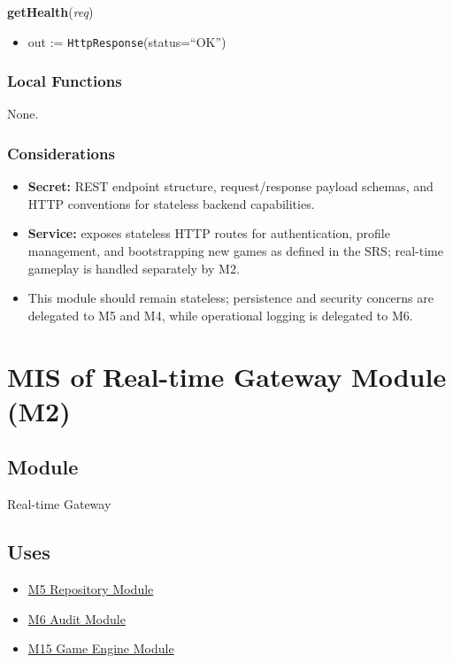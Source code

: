 \documentclass[12pt, titlepage]{article}
\begin{document}
\noindent\textbf{getHealth}(\textit{req})
\begin{itemize}
    \item out := \texttt{HttpResponse}(status=``OK'')
\end{itemize}

\subsubsection{Local Functions}
None.

\subsubsection{Considerations}
\begin{itemize}
    \item \textbf{Secret:} REST endpoint structure, request/response payload schemas, and HTTP conventions for stateless backend capabilities.
    \item \textbf{Service:} exposes stateless HTTP routes for authentication, profile management, and bootstrapping new games as defined in the SRS; real-time gameplay is handled separately by M2.
    \item This module should remain stateless; persistence and security concerns are delegated to M5 and M4, while operational logging is delegated to M6.
\end{itemize}


\newpage
\section{MIS of Real-time Gateway Module (M2)}\label{sec:realtime-gateway-module}

\subsection{Module}
Real-time Gateway

\subsection{Uses}
\begin{itemize}
    \item \hyperref[sec:repository-module]{M5 Repository Module}
    \item \hyperref[sec:audit-module]{M6 Audit Module}
    \item \hyperref[sec:game-engine-module]{M15 Game Engine Module}
\end{itemize}
\end{document}
